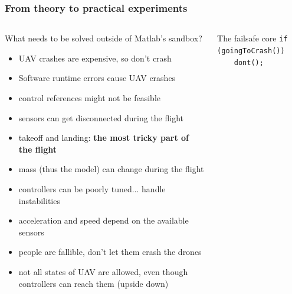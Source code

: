 \documentclass[aspectratio=169]{beamer}
\begin{document}
\begin{frame}
  \frametitle{From theory to practical experiments}

  \begin{columns}[c]

    \begin{block}{What needs to be solved outside of Matlab's sandbox?}
      \begin{itemize}
        \item UAV crashes are expensive, so don't crash
        \item Software runtime errors cause UAV crashes
        \item control references might not be feasible
        \item sensors can get disconnected during the flight
        \item takeoff and landing: \textbf{the most tricky part of the flight}
        \item mass (thus the model) can change during the flight
        \item controllers can be poorly tuned... handle instabilities
        \item acceleration and speed depend on the available sensors
        \item people are fallible, don't let them crash the drones
        \item not all states of UAV are allowed, even though controllers can reach them (upside down)
      \end{itemize}
    \end{block}

    \begin{block}{The failsafe core}
      \texttt{if (goingToCrash())}\\
      \texttt{~~~~dont();}
    \end{block}

  \end{columns}

\end{frame}

\end{document}
